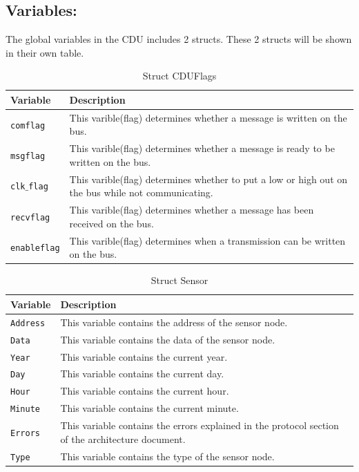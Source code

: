 \subsection{Variables:}
The global variables in the CDU includes 2 structs. These 2 structs will be shown in their own table.
\begin{table}[H]
\begin{tabular}{|l|p{10cm}|}
\hline
\cellcolor[gray]{0.8}\textbf{Variable} &\cellcolor[gray]{0.8} \textbf{Description}\\ \hline
\texttt{comflag} & This varible(flag) determines whether a message is written on the bus.\\ 
\hline
\texttt{msgflag} & This varible(flag) determines whether a message is ready to be written on the bus.\\ 
\hline
\texttt{clk$\_$flag} & This varible(flag) determines whether to put a low or high out on the bus while not communicating.\\ 
\hline
\texttt{recvflag} & This varible(flag) determines whether a message has been received on the bus.\\ 
\hline
\texttt{enableflag} & This varible(flag) determines when a transmission can be written on the bus.\\ 
\hline
\end{tabular}
\label{tab:structcduflags}
\caption{Struct CDUFlags}
\end{table}

\begin{table}[H]
\begin{tabular}{|l|p{10cm}|}
\hline
\cellcolor[gray]{0.8}\textbf{Variable} &\cellcolor[gray]{0.8} \textbf{Description}\\ \hline
\texttt{Address} & This variable contains the address of the sensor node.\\ 
\hline
\texttt{Data} & This variable contains the data of the sensor node.\\ 
\hline
\texttt{Year} & This variable contains the current year.\\ 
\hline
\texttt{Day} & This variable contains the current day.\\ 
\hline
\texttt{Hour} & This variable contains the current hour.\\ 
\hline
\texttt{Minute} & This variable contains the current minute.\\ 
\hline
\texttt{Errors} & This variable contains the errors explained in the protocol section of the architecture document.\\ 
\hline
\texttt{Type} & This variable contains the type of the sensor node.\\ 
\hline
\end{tabular}
\label{tab:structsensor}
\caption{Struct Sensor}
\end{table}

